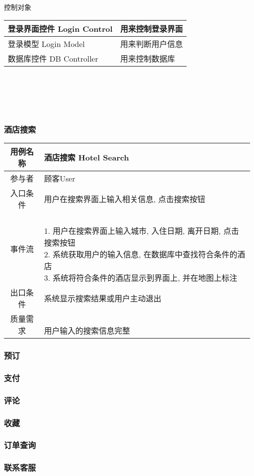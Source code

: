 \documentclass[11pt]{article}
\begin{document}
			
			控制对象 \\
			\begin{tabular}{l|l}\hline
			登录界面控件 Login Control & 用来控制登录界面 \\ \hline
			登录模型 Login Model & 用来判断用户信息 \\ \hline 	
			数据库控件 DB Controller & 用来控制数据库 \\ \hline
			\end{tabular} \\ \\ \\ \\
			
			
						
		\subsubsection{酒店搜索}
			\begin{tabular}{c|l}
			\hline
			用例名称 & 酒店搜索 Hotel Search \\ \hline
			参与者 & 顾客User  \\ \hline
			入口条件 & 用户在搜索界面上输入相关信息, 点击搜索按钮 \\ \hline
			事件流 & 	\parbox{33em}{\ \\
						1. 用户在搜索界面上输入城市, 入住日期,  离开日期, 点击搜索按钮 \\
						2. 系统获取用户的输入信息, 在数据库中查找符合条件的酒店 \\
						3. 系统将符合条件的酒店显示到界面上, 并在地图上标注  \\
						} \\ \hline
			出口条件 & 系统显示搜索结果或用户主动退出 \\ \hline
			质量需求 & \parbox{33em}{\ \\
						用户输入的搜索信息完整 \\
						} \\ \hline
			\end{tabular}

		\subsubsection{预订}
		\subsubsection{支付}
		\subsubsection{评论}
		\subsubsection{收藏}
		\subsubsection{订单查询}
		\subsubsection{联系客服}
	
	
	
\end{document}
